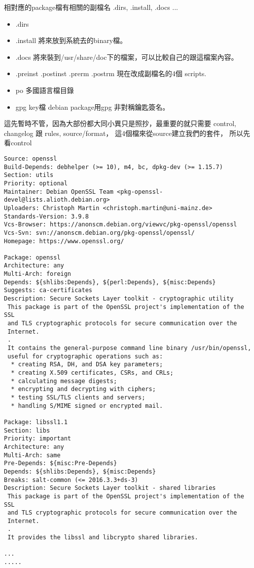   相對應的package檔有相關的副檔名 .dirs, .install, .docs ...
  \begin{itemize}
    \item .dirs
    \item .install 將來放到系統去的binary檔。
    \item .docs 將來裝到/usr/share/doc下的檔案，可以比較自己的跟這檔案內容。
    \item .preinst .postinst .prerm .postrm 現在改成副檔名的4個 scripts.
    \item po 多國語言檔目錄
    \item gpg key檔 debian package用gpg 非對稱鑰匙簽名。
  \end{itemize}
  這先暫時不管，因為大部份都大同小異只是照抄，最重要的就只需要
  control, changelog 跟 rules, source/format， 這4個檔來從source建立我們的套件，
  所以先看control
  \begin{verbatim}
Source: openssl
Build-Depends: debhelper (>= 10), m4, bc, dpkg-dev (>= 1.15.7)
Section: utils
Priority: optional
Maintainer: Debian OpenSSL Team <pkg-openssl-devel@lists.alioth.debian.org>
Uploaders: Christoph Martin <christoph.martin@uni-mainz.de>
Standards-Version: 3.9.8
Vcs-Browser: https://anonscm.debian.org/viewvc/pkg-openssl/openssl
Vcs-Svn: svn://anonscm.debian.org/pkg-openssl/openssl/
Homepage: https://www.openssl.org/

Package: openssl
Architecture: any
Multi-Arch: foreign
Depends: ${shlibs:Depends}, ${perl:Depends}, ${misc:Depends}
Suggests: ca-certificates
Description: Secure Sockets Layer toolkit - cryptographic utility
 This package is part of the OpenSSL project's implementation of the SSL
 and TLS cryptographic protocols for secure communication over the
 Internet.
 .
 It contains the general-purpose command line binary /usr/bin/openssl,
 useful for cryptographic operations such as:
  * creating RSA, DH, and DSA key parameters;
  * creating X.509 certificates, CSRs, and CRLs;
  * calculating message digests;
  * encrypting and decrypting with ciphers;
  * testing SSL/TLS clients and servers;
  * handling S/MIME signed or encrypted mail.

Package: libssl1.1
Section: libs
Priority: important
Architecture: any
Multi-Arch: same
Pre-Depends: ${misc:Pre-Depends}
Depends: ${shlibs:Depends}, ${misc:Depends}
Breaks: salt-common (<= 2016.3.3+ds-3)
Description: Secure Sockets Layer toolkit - shared libraries
 This package is part of the OpenSSL project's implementation of the SSL
 and TLS cryptographic protocols for secure communication over the
 Internet.
 .
 It provides the libssl and libcrypto shared libraries.

...
.....
  \end{verbatim}
